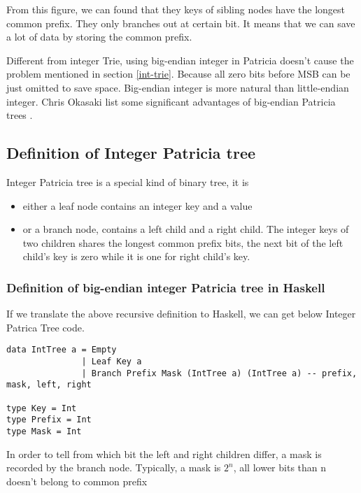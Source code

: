 \documentclass{article}
\begin{document}
From this figure, we can found that they keys of sibling nodes have the longest common prefix.
They only branches out at certain bit. It means that we can save a lot of data by storing the common
prefix. 

Different from integer Trie, using big-endian integer in Patricia doesn't cause the problem mentioned
in section \ref{int-trie}. Because all zero bits before MSB can be just omitted to save space. Big-endian
integer is more natural than little-endian integer. Chris Okasaki list some significant advantages
of big-endian Patricia trees \cite{okasaki-int-map}.

\subsection{Definition of Integer Patricia tree}
Integer Patricia tree is a special kind of binary tree, it is
\begin{itemize}
\item either a leaf node contains an integer key and a value
\item or a branch node, contains a left child and a right child. The
integer keys of two children shares the longest common prefix bits,
the next bit of the left child's key is zero while it is one for right
child's key.
\end{itemize}

\subsubsection*{Definition of big-endian integer Patricia tree in Haskell}
If we translate the above recursive definition to Haskell, we can get
below Integer Patrica Tree code.

\lstset{language=Haskell}
\begin{lstlisting}
data IntTree a = Empty 
               | Leaf Key a
               | Branch Prefix Mask (IntTree a) (IntTree a) -- prefix, mask, left, right

type Key = Int
type Prefix = Int
type Mask = Int
\end{lstlisting}

In order to tell from which bit the left and right children differ, a
mask is recorded by the branch node. Typically, a mask is $2^n$, all
lower bits than n doesn't belong to common prefix
\end{document}
